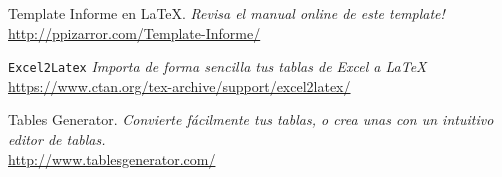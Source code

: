 \newpage
\begin{thebibliography}
	
		Template Informe en \LaTeX.
		\textit{Revisa el manual online de este template!} \\
		\url{http://ppizarror.com/Template-Informe/}
		
		\texttt{Excel2Latex}
		\textit{Importa de forma sencilla tus tablas de Excel a \LaTeX} \\
		\url{https://www.ctan.org/tex-archive/support/excel2latex/}
		
		Tables Generator.
		\textit{Convierte fácilmente tus tablas, o crea unas con un intuitivo editor de tablas.} \\
		\url{http://www.tablesgenerator.com/}
	
\end{thebibliography}